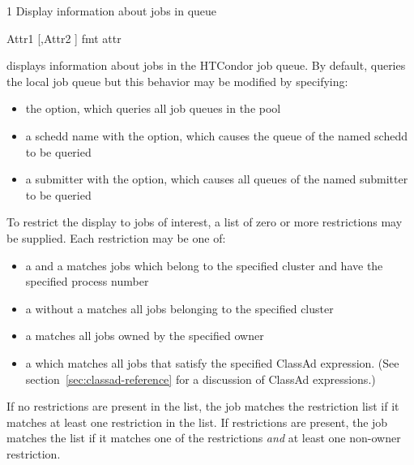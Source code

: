 \begin{ManPage}{\label{man-condor-q}}{1}
{Display information about jobs in queue}
\Synopsis {}

\ToolDebugOption
{} 
 {Attr1 [,Attr2 \Dots]}
 {fmt attr}


\Description
{} displays information about jobs in the HTCondor job queue.  By
default,  queries the local job queue but this behavior may be 
modified by specifying:
\begin{itemize}
	\item the  option, which queries all job queues in the pool
	\item a schedd name with the  option, which causes the queue of 
		the named schedd to be queried 
	\item a submitter with the  option, which causes all queues
		of the named submitter to be queried
\end{itemize}

To restrict the display to jobs of interest, a list of zero or more 
restrictions may be supplied.  Each restriction may be one of:
\begin{itemize}
	\item a  and a  matches jobs which
		belong to the specified cluster and have the specified process number
	\item a  without a  matches all jobs belonging
		to the specified cluster
	\item a  matches all jobs owned by the specified owner
	\item a  which matches all jobs that
		satisfy the specified ClassAd expression. (See section~\ref{sec:classad-reference}
		for a discussion of ClassAd expressions.)
\end{itemize}
If no  restrictions are present in the list, the job matches the 
restriction list if it matches at least one restriction in the list.  If 
 restrictions are present, the job matches the list if it matches 
one of the  restrictions \emph{and} at least one non-owner 
restriction.


\end{ManPage}
